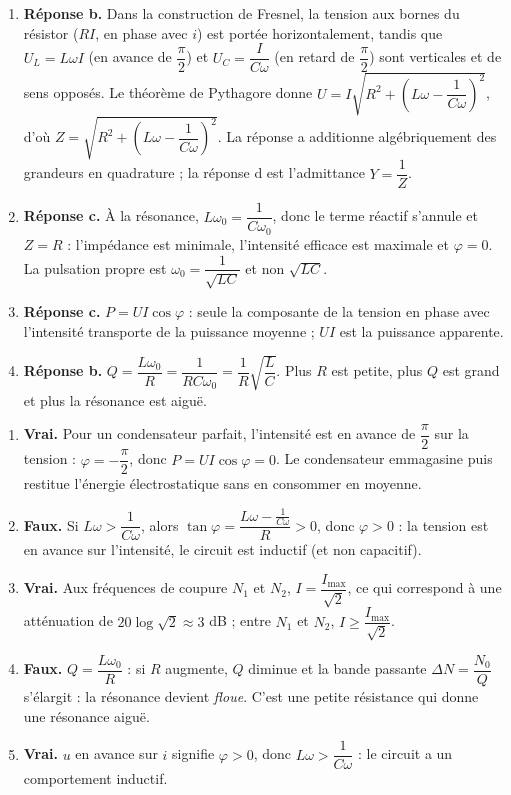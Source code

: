 \documentclass[11pt]{article}
\newcommand{\cle}[1]{{\popxbold\color{popdark}#1}}
\begin{document}
\begin{corrige}
\begin{enumerate}
\item \textbf{Réponse b.} Dans la construction de Fresnel, la tension aux bornes du résistor ($RI$, en phase avec $i$) est portée horizontalement, tandis que $U_L = L\omega I$ (en avance de $\dfrac{\pi}{2}$) et $U_C = \dfrac{I}{C\omega}$ (en retard de $\dfrac{\pi}{2}$) sont verticales et de sens opposés. Le théorème de Pythagore donne $U = I\sqrt{R^2 + \left(L\omega - \dfrac{1}{C\omega}\right)^2}$, d'où $Z = \sqrt{R^2 + \left(L\omega - \dfrac{1}{C\omega}\right)^2}$. La réponse a additionne algébriquement des grandeurs en quadrature ; la réponse d est l'admittance $Y = \dfrac{1}{Z}$.
\item \textbf{Réponse c.} À la résonance, $L\omega_0 = \dfrac{1}{C\omega_0}$, donc le terme réactif s'annule et $Z = R$ : l'impédance est minimale, l'intensité efficace est maximale et $\varphi = 0$. La pulsation propre est $\omega_0 = \dfrac{1}{\sqrt{LC}}$ et non $\sqrt{LC}$.
\item \textbf{Réponse c.} $P = UI\cos\varphi$ : seule la composante de la tension en phase avec l'intensité transporte de la puissance moyenne ; $UI$ est la puissance apparente.
\item \textbf{Réponse b.} $Q = \dfrac{L\omega_0}{R} = \dfrac{1}{RC\omega_0} = \dfrac{1}{R}\sqrt{\dfrac{L}{C}}$. Plus $R$ est petite, plus $Q$ est grand et plus la résonance est aiguë.
\end{enumerate}
\end{corrige}

\begin{corrige}
\begin{enumerate}
\item \textbf{Vrai.} Pour un condensateur parfait, l'intensité est en avance de $\dfrac{\pi}{2}$ sur la tension : $\varphi = -\dfrac{\pi}{2}$, donc $P = UI\cos\varphi = 0$. Le condensateur emmagasine puis restitue l'énergie électrostatique sans en consommer en moyenne.
\item \textbf{Faux.} Si $L\omega > \dfrac{1}{C\omega}$, alors $\tan\varphi = \dfrac{L\omega - \frac{1}{C\omega}}{R} > 0$, donc $\varphi > 0$ : la tension est en avance sur l'intensité, le circuit est \cle{inductif} (et non capacitif).
\item \textbf{Vrai.} Aux fréquences de coupure $N_1$ et $N_2$, $I = \dfrac{I_{\max}}{\sqrt{2}}$, ce qui correspond à une atténuation de $20\log\sqrt{2} \approx 3$ dB ; entre $N_1$ et $N_2$, $I \geq \dfrac{I_{\max}}{\sqrt{2}}$.
\item \textbf{Faux.} $Q = \dfrac{L\omega_0}{R}$ : si $R$ augmente, $Q$ diminue et la bande passante $\Delta N = \dfrac{N_0}{Q}$ s'élargit : la résonance devient \emph{floue}. C'est une petite résistance qui donne une résonance aiguë.
\item \textbf{Vrai.} $u$ en avance sur $i$ signifie $\varphi > 0$, donc $L\omega > \dfrac{1}{C\omega}$ : le circuit a un comportement inductif.
\end{enumerate}
\end{corrige}
\end{document}
